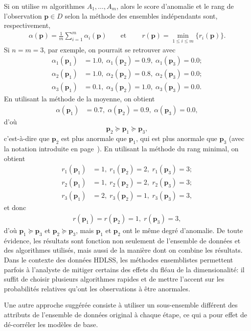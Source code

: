 \par Si on utilise $m$ algorithmes $A_1, \ldots, A_m$, alors le score d'anomalie et le rang de l'observation $\mathbf{p}\in D$ selon la m\'ethode des ensembles ind\'ependants sont, respectivement, 
\begin{align*}
\alpha(\mathbf{p})=\frac{1}{m}\sum_{i=1}^{m}\alpha_i(\mathbf{p}) \qquad \text{et}\; \qquad r(\mathbf{p}) =\min_{1\leq i \leq m} \{r_i(\mathbf{p})\}.
\end{align*}
Si $n=m=3$, par exemple, on pourrait se retrouver avec 
\begin{align*}\alpha_{1}\left(\mathbf{p}_{1}\right)&=1.0,\; \alpha_{1}\left(\mathbf{p}_{2}\right)=0.9,\; \alpha_{1}\left(\mathbf{p}_{3}\right)=0.0; \\ 
\alpha_{2}\left(\mathbf{p}_{1}\right)&=1.0,\; \alpha_{2}\left(\mathbf{p}_{2}\right)=0.8,\; \alpha_{2}\left(\mathbf{p}_{3}\right)=0.0;\\
\alpha_{3}\left(\mathbf{p}_{1}\right)&=0.1,\;  \alpha_{3}\left(\mathbf{p}_{2}\right)=1.0,\; \alpha_{3}\left(\mathbf{p}_{3}\right)=0.0.
\end{align*}
En utilisant la m\'ethode de la moyenne, on obtient 
\begin{align*}
\alpha\left(\mathbf{p}_{1}\right)&=0.7,\; \alpha\left(\mathbf{p}_{2}\right)=0.9,\; \alpha\left(\mathbf{p}_{3}\right)=0.0,
\end{align*}
d'o\`u $$\mathbf{p}_2\succeq \mathbf{p}_1\succeq \mathbf{p}_3,$$ c'est-\`a-dire que $\mathbf{p}_2$ est plus anormale que $\mathbf{p}_1$, qui est plus anormale que $\mathbf{p}_3$ (avec la notation introduite en page~\pageref{succeq}). 
\newl 
En utilisant la m\'ethode du rang minimal, on obtient 
\begin{align*}
r_{1}\left(\mathbf{p}_{1}\right)&=1,\; r_{1}\left(\mathbf{p}_{2}\right)=2,\; r_{1}\left(\mathbf{p}_{3}\right)=3;\\ 
r_{2}\left(\mathbf{p}_{1}\right)&=1,\; r_{2}\left(\mathbf{p}_{2}\right)=2,\; r_{2}\left(\mathbf{p}_{3}\right)=3;\\
r_{3}\left(\mathbf{p}_{1}\right)&=2,\; r_{3}\left(\mathbf{p}_{2}\right)=1,\; r_{3}\left(\mathbf{p}_{3}\right)=3,
\end{align*}
et donc
\begin{align*}
r\left(\mathbf{p}_{1}\right)=r\left(\mathbf{p}_{2}\right)=1,\; r \left(\mathbf{p}_{3}\right)=3, 
\end{align*}
d'o\`u $\mathbf{p}_1\succeq \mathbf{p}_3$ et $\mathbf{p}_2\succeq \mathbf{p}_3$, mais $\mathbf{p}_1$ et $\mathbf{p}_2$ ont le m\^eme degr\'e d'anomalie. 
\newl De toute \'evidence, les r\'esultats sont fonction non seulement de l'ensemble de donn\'ees et des algorithmes utilis\'es, mais aussi de la mani\`ere dont on combine les r\'esultats. 
\newl Dans le contexte des donn\'ees HDLSS, les m\'ethodes ensemblistes permettent parfois \`a l'analyste de mitiger certains des effets du fl\'eau de la dimensionalit\'e: il suffit de choisir plusieurs algorithmes rapides et de mettre l'accent sur les probabilit\'es relatives qu'ont les observations \`a \^etre anormales. \par Une autre approche suggérée consiste à utiliser un sous-ensemble différent des attributs de l'ensemble de données original à chaque étape, ce qui a pour effet de dé-corréler les modèles de base. 
%
%
